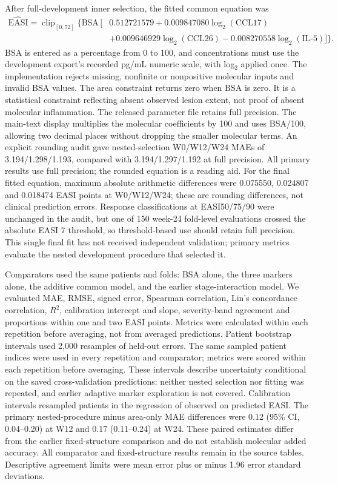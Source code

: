 After full-development inner selection, the fitted common equation was
\begin{align*}
\widehat{\mathrm{EASI}}=\operatorname{clip}_{[0,72]}\{\mathrm{BSA}\,[&0.512721579
 +0.009847080\log_2(\mathrm{CCL17})\\
 &+0.009646929\log_2(\mathrm{CCL26})
 -0.008270558\log_2(\mathrm{IL\mbox{-}5})]\}.
\end{align*}
BSA is entered as a percentage from 0 to 100, and concentrations must use the development export's recorded pg/mL numeric scale, with log$_2$ applied once. The implementation rejects missing, nonfinite or nonpositive molecular inputs and invalid BSA values. The area constraint returns zero when BSA is zero. It is a statistical constraint reflecting absent observed lesion extent, not proof of absent molecular inflammation. The released parameter file retains full precision. The main-text display multiplies the molecular coefficients by 100 and uses BSA/100, allowing two decimal places without dropping the smaller molecular terms. An explicit rounding audit gave nested-selection W0/W12/W24 MAEs of 3.194/1.298/1.193, compared with 3.194/1.297/1.192 at full precision. All primary results use full precision; the rounded equation is a reading aid. For the final fitted equation, maximum absolute arithmetic differences were 0.075550, 0.024807 and 0.018474 EASI points at W0/W12/W24; these are rounding differences, not clinical prediction errors. Response classifications at EASI50/75/90 were unchanged in the audit, but one of 150 week-24 fold-level evaluations crossed the absolute EASI 7 threshold, so threshold-based use should retain full precision. This single final fit has not received independent validation; primary metrics evaluate the nested development procedure that selected it.

Comparators used the same patients and folds: BSA alone, the three markers alone, the additive common model, and the earlier stage-interaction model. We evaluated MAE, RMSE, signed error, Spearman correlation, Lin's concordance correlation, $R^2$, calibration intercept and slope, severity-band agreement and proportions within one and two EASI points. Metrics were calculated within each repetition before averaging, not from averaged predictions. Patient bootstrap intervals used 2,000 resamples of held-out errors. The same sampled patient indices were used in every repetition and comparator; metrics were scored within each repetition before averaging. These intervals describe uncertainty conditional on the saved cross-validation predictions: neither nested selection nor fitting was repeated, and earlier adaptive marker exploration is not covered. Calibration intervals resampled patients in the regression of observed on predicted EASI. The primary nested-procedure minus area-only MAE differences were 0.12 (95\% CI, 0.04--0.20) at W12 and 0.17 (0.11--0.24) at W24. These paired estimates differ from the earlier fixed-structure comparison and do not establish molecular added accuracy. All comparator and fixed-structure results remain in the source tables. Descriptive agreement limits were mean error plus or minus 1.96 error standard deviations.\citep{bland2007}

